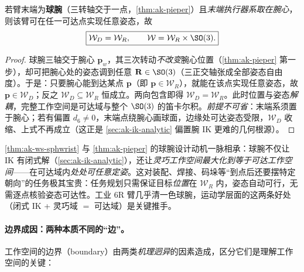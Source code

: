 \begin{theorem}[球腕使灵巧域等于可达域]\label{thm:ak-ws-sphwrist}
若臂末端为\textbf{球腕}（三转轴交于一点，\cref{thm:ak-pieper}）且\emph{末端执行器系取在腕心}，则该臂可在任一可达点实现任意姿态，故\cite{murray1994mathematical}
\begin{equation}
  \boxed{\mathcal{W}_D=\mathcal{W}_R,\qquad \mathcal{W}=\mathcal{W}_R\times\SO(3).}
  \label{eq:ak-ws-sphwrist}
\end{equation}
\end{theorem}
\begin{proof}
球腕三轴交于腕心 $\mathbf{p}_w$，其三次转动\emph{不改变}腕心位置（\cref{thm:ak-pieper} 第一步），却可把腕心处的姿态调到任意 $\mathbf{R}\in\SO(3)$（三正交轴张成全部姿态自由度）。于是：只要腕心能到达某点 $\mathbf{p}$（即 $\mathbf{p}\in\mathcal{W}_R$），就能在该点实现任意姿态，故 $\mathbf{p}\in\mathcal{W}_D$；反之 $\mathcal{W}_D\subseteq\mathcal{W}_R$ 恒成立。两向包含即得 $\mathcal{W}_D=\mathcal{W}_R$。此时位置与姿态\emph{解耦}，完整工作空间是可达域与整个 $\SO(3)$ 的笛卡尔积。\emph{前提不可省}：末端系须置于腕心；若有偏置 $d_6\ne0$，末端点绕腕心画球面，边缘处可达姿态受限，$\mathcal{W}_D$ 收缩、上式不再成立（这正是 \cref{sec:ak-ik-analytic} 偏置腕 IK 更难的几何根源）。
\end{proof}

\begin{insight}
\cref{thm:ak-ws-sphwrist} 与 \cref{thm:ak-pieper} 的球腕设计动机一脉相承：球腕不仅让 IK 有闭式解（\cref{sec:ak-ik-analytic}），还让\emph{灵巧工作空间最大化到等于可达工作空间}——在可达域内\emph{处处可任意定姿}。这对装配、焊接、码垛等“到点后还要摆特定朝向”的任务极其宝贵：任务规划只需保证目标\emph{位置}在 $\mathcal{W}_R$ 内，姿态自动可行，无需逐点核验姿态可达性。工业 6R 臂几乎清一色球腕，运动学层面的这两条好处（闭式 IK + 灵巧域 $=$ 可达域）是关键推手。
\end{insight}

\paragraph{边界成因：两种本质不同的“边”。}
工作空间的边界（boundary）由两类\emph{机理迥异}的因素造成，区分它们是理解工作空间的关键：


